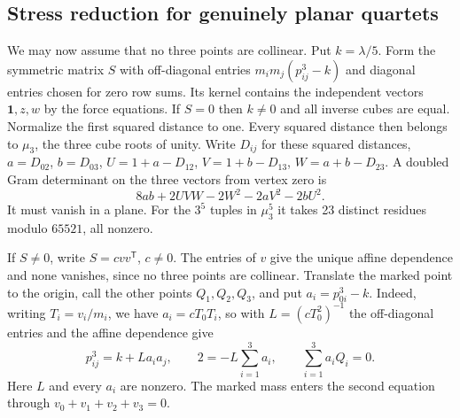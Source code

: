 \documentclass[11pt,letterpaper]{article}
\theoremstyle{definition}
\begin{document}
\subsection{Stress reduction for genuinely planar quartets}

We may now assume that no three points are collinear. Put
$k=\lambda/5$. Form the symmetric matrix $S$ with off-diagonal
entries $m_i m_j(p_{ij}^3-k)$ and diagonal entries chosen for zero
row sums. Its kernel contains the independent vectors
$\mathbf1,z,w$ by the force equations. If $S=0$ then $k\ne0$ and
all inverse cubes are equal. Normalize the first squared distance
to one. Every squared distance then belongs to $\mu_3$, the three
cube roots of unity. Write $D_{ij}$ for these squared distances,
$a=D_{02}$, $b=D_{03}$, $U=1+a-D_{12}$, $V=1+b-D_{13}$,
$W=a+b-D_{23}$. A doubled Gram determinant on the three vectors
from vertex zero is
\[
 8ab+2UVW-2W^2-2aV^2-2bU^2 .
\]
It must vanish in a plane. For the $3^5$ tuples in $\mu_3^5$ it
takes 23 distinct residues modulo $65521$, all nonzero.

If $S\ne0$, write $S=c vv^{\mathsf T}$, $c\ne0$. The entries of
$v$ give the unique affine dependence and none vanishes, since no
three points are collinear. Translate the marked point to the origin,
call the other points $Q_1,Q_2,Q_3$, and put $a_i=p_{0i}^3-k$.
Indeed, writing $T_i=v_i/m_i$, we have $a_i=cT_0T_i$, so with
$L=(cT_0^2)^{-1}$ the off-diagonal entries and the affine dependence
give
\begin{equation}
  p_{ij}^3=k+L a_i a_j,\qquad
 2=-L\sum_{i=1}^3a_i,\qquad \sum_{i=1}^3a_i Q_i=0 .
 \label{ff:stress}
\end{equation}
Here $L$ and every $a_i$ are nonzero. The marked mass enters the
second equation through $v_0+v_1+v_2+v_3=0$.
\end{document}
